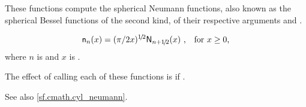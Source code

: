 \begin{itemdescr}
\pnum
\effects
These functions compute the spherical Neumann functions,
also known as the spherical Bessel functions of the second kind,
of their respective arguments
 and .

\pnum
\returns
\[ \mathsf{n}_n(x) = (\pi/2x)^{1\!/\!2} \mathsf{N}_{n + 1\!/\!2}(x)
   \text{ ,\quad for $x \ge 0$,} \]
where
$n$ is  and
$x$ is .

\pnum
\remarks
The effect of calling each of these functions
is 
if .

\pnum
See also \ref{sf.cmath.cyl_neumann}.
\end{itemdescr}

